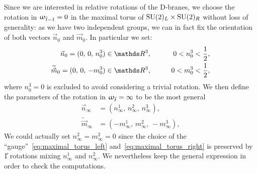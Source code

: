 Since we are interested in relative rotations of the D-branes, we choose the
rotation in $\upomega_{\overline{t}-1} = 0$ in the maximal torus of $\mathrm{SU}(2)_L \times \mathrm{SU}(2)_R$ without loss of generality: as we have two independent groups, we can in fact fix the orientation of both vectors $\vec{n}_{0}$ and $\vec{m}_{0}$.
In particular we set:
\begin{eqnarray}
  \vec{n}_{0}
  =
  ( 0,\, 0,\, n_{0}^3 ) \in \R^3,
  & \qquad &
  0 < n_{0}^3 < \frac{1}{2},
  \label{eq:maximal_torus_left}
  \\
  \widetilde{\vec{m}}_{0}
  =
  ( 0,\, 0,\, -m_{0}^3 ) \in \R^3,
  & \qquad &
  0 < m_{0}^3 < \frac{1}{2},
  \label{eq:maximal_torus_right}
\end{eqnarray}
where $n_{0}^3 = 0$ is excluded to avoid considering a trivial rotation.
We then define the parameters of the rotation in $\upomega_{\overline{t}} = \infty$ to be the most general
\begin{equation}
  \begin{split}
    \vec{n}_{\infty}
    & =
    ( n_{\infty}^1,\, n_{\infty}^2,\, n_{\infty}^3 ),
    \\
    \widetilde{\vec{m}}_{\infty}
    & =
    ( -m_{\infty}^1,\, m_{\infty}^2,\, -m_{\infty}^3 ),
\end{split}
\end{equation}
We could actually set $n_{\infty}^2 = m_{\infty}^2 = 0$ since the choice of the ``gauge''~\eqref{eq:maximal_torus_left} and~\eqref{eq:maximal_torus_right} is preserved by \U{1} rotations mixing $n_{\infty}^1$ and $n_{\infty}^2$.
We nevertheless keep the general expression in order to check the computations.

